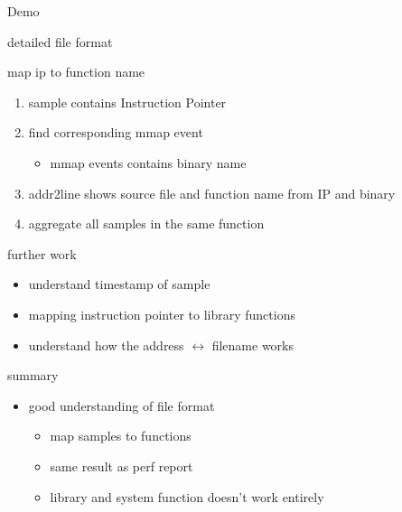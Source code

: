 \begin{frame}{Demo}
\end{frame}

\begin{frame}{detailed file format\label{sec:fileformat}}
\end{frame}

\begin{frame}{map ip to function name}
\begin{enumerate}
  \item sample contains Instruction Pointer
  \item find corresponding mmap event
  \begin{itemize}
    \item mmap events contains binary name
  \end{itemize}
  \item addr2line shows source file and function name from IP and binary
  \item aggregate all samples in the same function
\end{enumerate}
\end{frame}

\begin{frame}{further work}
\begin{itemize}
  \item understand timestamp of sample
  \item mapping instruction pointer to library functions
  \item understand how the address $\leftrightarrow$ filename works
\end{itemize}
\end{frame}

\begin{frame}{summary}
\begin{itemize}
  \item good understanding of file format
  \begin{itemize}
    \item map samples to functions
    \item same result as perf report
    \item library and system function doesn't work entirely
  \end{itemize}
\end{itemize}
\end{frame}



